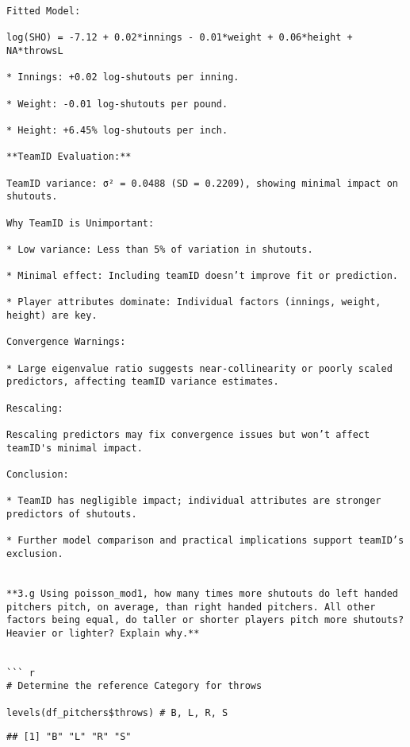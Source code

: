 \documentclass[
]{article}
\begin{document}
\begin{verbatim}
Fitted Model:

log(SHO) = -7.12 + 0.02*innings - 0.01*weight + 0.06*height + NA*throwsL

* Innings: +0.02 log-shutouts per inning.

* Weight: -0.01 log-shutouts per pound.

* Height: +6.45% log-shutouts per inch.

**TeamID Evaluation:**

TeamID variance: σ² = 0.0488 (SD = 0.2209), showing minimal impact on shutouts.

Why TeamID is Unimportant:

* Low variance: Less than 5% of variation in shutouts.

* Minimal effect: Including teamID doesn’t improve fit or prediction.

* Player attributes dominate: Individual factors (innings, weight, height) are key.

Convergence Warnings:

* Large eigenvalue ratio suggests near-collinearity or poorly scaled predictors, affecting teamID variance estimates.

Rescaling:

Rescaling predictors may fix convergence issues but won’t affect teamID's minimal impact.

Conclusion:

* TeamID has negligible impact; individual attributes are stronger predictors of shutouts.

* Further model comparison and practical implications support teamID’s exclusion.


**3.g Using poisson_mod1, how many times more shutouts do left handed pitchers pitch, on average, than right handed pitchers. All other factors being equal, do taller or shorter players pitch more shutouts? Heavier or lighter? Explain why.**


``` r
# Determine the reference Category for throws

levels(df_pitchers$throws) # B, L, R, S
\end{verbatim}

\begin{verbatim}
## [1] "B" "L" "R" "S"
\end{verbatim}
\end{document}
